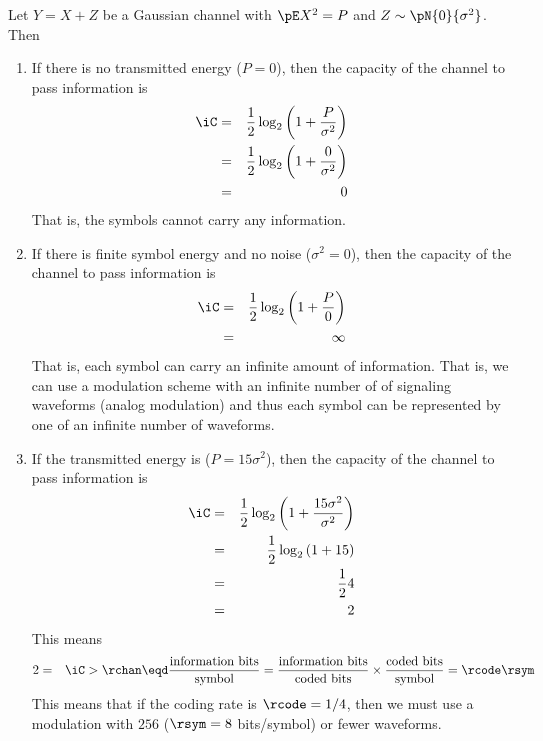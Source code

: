 \begin{theorem}
Let $Y=X+Z$ be a Gaussian channel with $\pE X^2=P$ and
$Z\sim\pN{0}{\sigma^2}$. Then
\end{theorem}

\begin{example}
\begin{enumerate}
  \item If there is no transmitted energy ($P=0$), then the capacity of
        the channel to pass information is
    \begin{eqnarray*}
      \iC 
        &=& \frac{1}{2}\log_2\left( 1 + \frac{P}{\sigma^2}\right)
      \\&=& \frac{1}{2}\log_2\left( 1 + \frac{0}{\sigma^2}\right)
      \\&=& 0
    \end{eqnarray*}
  That is, the symbols cannot carry any information.

  \item If there is finite symbol energy and no noise ($\sigma^2=0$),
        then the capacity of the channel to pass information is
    \begin{eqnarray*}
      \iC 
        &=& \frac{1}{2}\log_2\left( 1 + \frac{P}{0}\right)
      \\&=& \infty
    \end{eqnarray*}
  That is, each symbol can carry an infinite amount of information.
  That is, we can use a modulation scheme with an infinite 
  number of of signaling waveforms (analog modulation)
  and thus each symbol can be represented by one of an 
  infinite number of waveforms.

  \item If the transmitted energy is ($P=15\sigma^2$), 
        then the capacity of the channel to pass information is
    \begin{eqnarray*}
      \iC 
        &=& \frac{1}{2}\log_2\left( 1 + \frac{15\sigma^2}{\sigma^2}\right)
      \\&=& \frac{1}{2}\log_2\left( 1 + 15\right)
      \\&=& \frac{1}{2} 4
      \\&=& 2
    \end{eqnarray*}
  This means
  \begin{eqnarray*}
    2
      &=& \iC
       >  \rchan
       \eqd \frac{\mbox{information bits}}{\mbox{symbol}}
       = \frac{\mbox{information bits}}{\mbox{coded bits}} \times
         \frac{\mbox{coded bits}}{\mbox{symbol}}
       = \rcode \rsym
  \end{eqnarray*}
  This means that if the coding rate is $\rcode=1/4$,
  then we must use a modulation with $256$ ($\rsym=8$ bits/symbol) 
  or fewer waveforms.


\end{enumerate}
\end{example}
